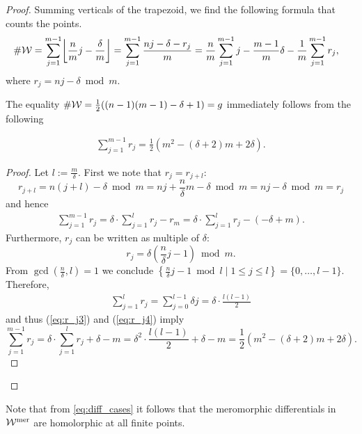 \documentclass[main.tex]{subfiles}
\begin{document}
\begin{proof}
Summing verticals of the trapezoid, we find the following formula that counts the points.
     \begin{align}\label{eq:r_j}
 \#\W & = \sum_{j = 1}^{m-1} \floor*{\frac{n}{m}j - \frac{\delta}{m}} = \sum_{j = 1}^{m-1} \frac{nj-\delta-r_j}{m} =
  \frac{n}{m} \sum_{j=1}^{m-1} j - \frac{m-1}{m}\delta - \frac{1}{m} \sum_{j=1}^{m-1} r_j,
     \end{align}
      where $r_j = nj - \delta  \bmod m$.

The equality  $\#\mathcal{W} = \frac{1}{2}((n-1)(m-1)-\delta+1) = g$ immediately follows from
the following
\begin{lemma}
      \begin{align}\label{eq:r_j2}
       \sum_{j=1}^{m-1} r_j = \frac{1}{2}(m^2 - (\delta+2)m + 2\delta).
      \end{align}
\end{lemma}
\begin{proof}
      Let $l := \frac{m}{\delta}$. First we note that $r_j = r_{j+l}$:
      $$r_{j+l} = n(j+l) - \delta  \bmod m = nj + \frac{n}{\delta}m - \delta  \bmod m =  nj - \delta  \bmod m =  r_j$$
      and hence
      \begin{align}\label{eq:r_j3}
       \sum_{j=1}^{m-1} r_j = \delta \cdot \sum_{j=1}^{l} r_j - r_m = \delta \cdot \sum_{j=1}^{l} r_j - (-\delta + m).
      \end{align}
      Furthermore, $r_j$ can be written as multiple of $\delta$:
      $$r_j = \delta \left(\frac{n}{\delta}j - 1\right)  \bmod m.$$
      From $\gcd(\frac{n}{\delta},l) = 1$ we conclude $\left\{  \frac{n}{\delta}j - 1  \bmod l  \mid  1 \le j \le l  \right\} = \{  0,\dots,l-1  \}$.
      Therefore,
      \begin{align}\label{eq:r_j4}
       \sum_{j = 1}^l r_j = \sum_{j = 0}^{l-1} \delta j = \delta \cdot \frac{l(l-1)}{2}
      \end{align}
      and thus (\ref{eq:r_j3}) and (\ref{eq:r_j4}) imply
      $$\sum_{j=1}^{m-1} r_j = \delta \cdot \sum_{j=1}^{l} r_j + \delta - m = \delta^2 \cdot \frac{l(l-1)}{2} + \delta - m = \frac{1}{2}(m^2 - (\delta+2)m + 2\delta).$$
\end{proof}
\end{proof}

\begin{rmk}
    Note that from \eqref{eq:diff_cases} it follows that the meromorphic differentials in $\mathcal{W}^{\text{mer}}$ are homolorphic at all finite points.
\end{rmk}

\biblio
\end{document}
